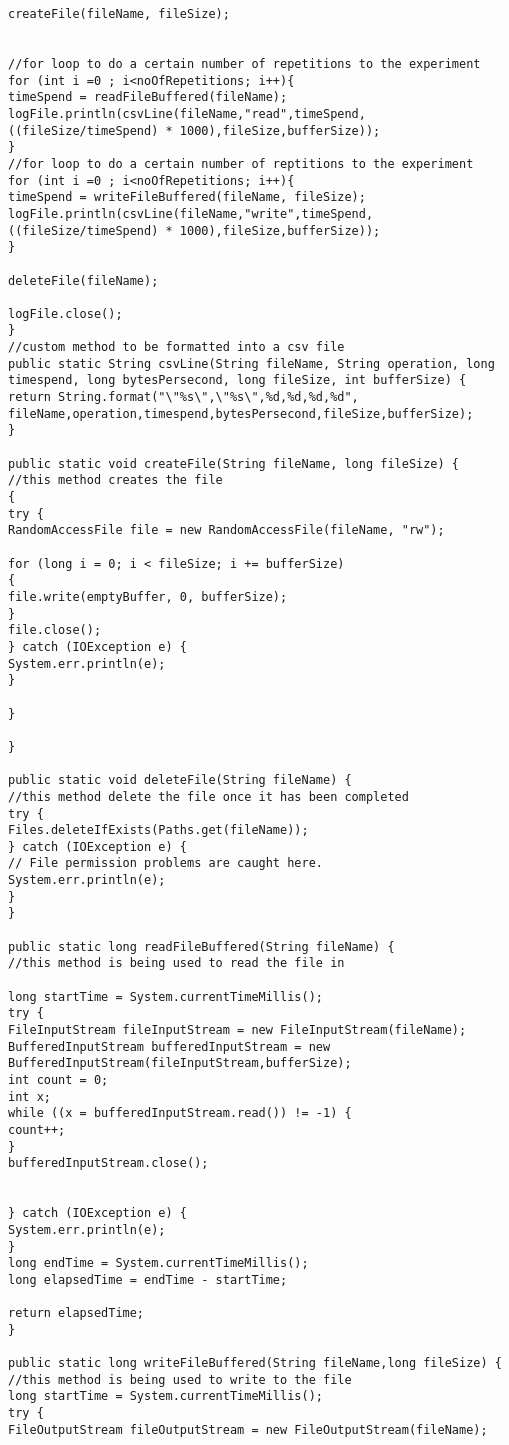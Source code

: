 \documentclass{article}
\begin{document}
\begin{lstlisting}
createFile(fileName, fileSize);


//for loop to do a certain number of repetitions to the experiment
for (int i =0 ; i<noOfRepetitions; i++){
timeSpend = readFileBuffered(fileName);
logFile.println(csvLine(fileName,"read",timeSpend,((fileSize/timeSpend) * 1000),fileSize,bufferSize));
}
//for loop to do a certain number of reptitions to the experiment
for (int i =0 ; i<noOfRepetitions; i++){
timeSpend = writeFileBuffered(fileName, fileSize);
logFile.println(csvLine(fileName,"write",timeSpend,((fileSize/timeSpend) * 1000),fileSize,bufferSize));
}

deleteFile(fileName);

logFile.close();
}
//custom method to be formatted into a csv file
public static String csvLine(String fileName, String operation, long timespend, long bytesPersecond, long fileSize, int bufferSize) {
return String.format("\"%s\",\"%s\",%d,%d,%d,%d", fileName,operation,timespend,bytesPersecond,fileSize,bufferSize);
}

public static void createFile(String fileName, long fileSize) {
//this method creates the file
{
try {
RandomAccessFile file = new RandomAccessFile(fileName, "rw");

for (long i = 0; i < fileSize; i += bufferSize)
{
file.write(emptyBuffer, 0, bufferSize);
}
file.close();
} catch (IOException e) {
System.err.println(e);
}

}

}

public static void deleteFile(String fileName) {
//this method delete the file once it has been completed
try {
Files.deleteIfExists(Paths.get(fileName));
} catch (IOException e) {
// File permission problems are caught here.
System.err.println(e);
}
}

public static long readFileBuffered(String fileName) {
//this method is being used to read the file in

long startTime = System.currentTimeMillis();
try {
FileInputStream fileInputStream = new FileInputStream(fileName);
BufferedInputStream bufferedInputStream = new BufferedInputStream(fileInputStream,bufferSize);
int count = 0;
int x;
while ((x = bufferedInputStream.read()) != -1) {
count++;
}
bufferedInputStream.close();


} catch (IOException e) {
System.err.println(e);
}
long endTime = System.currentTimeMillis();
long elapsedTime = endTime - startTime;

return elapsedTime;
}

public static long writeFileBuffered(String fileName,long fileSize) {
//this method is being used to write to the file
long startTime = System.currentTimeMillis();
try {
FileOutputStream fileOutputStream = new FileOutputStream(fileName);


\end{lstlisting}
\end{document}
